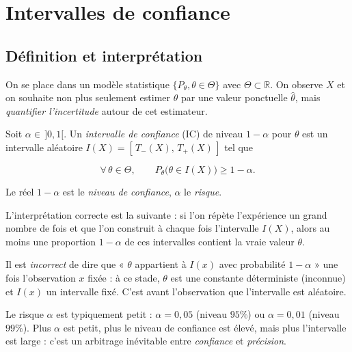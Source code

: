 \chapter{Intervalles de confiance}

\section{Définition et interprétation}

On se place dans un modèle statistique $\{P_\theta, \theta \in \Theta\}$ avec $\Theta \subset \mathbb R$. On observe $X$ et on souhaite non plus seulement estimer $\theta$ par une valeur ponctuelle $\hat\theta$, mais \textit{quantifier l'incertitude} autour de cet estimateur.

\medskip

\begin{mdframed}
\begin{definition}
Soit $\alpha \in\, ]0,1[$. Un \textit{intervalle de confiance} (IC) de niveau $1-\alpha$ pour $\theta$ est un intervalle aléatoire $I(X) = [\,T_-(X),\, T_+(X)\,]$ tel que

$$
\forall\,\theta \in \Theta, \qquad P_\theta\big(\theta \in I(X)\big) \ge 1-\alpha.
$$

Le réel $1-\alpha$ est le \textit{niveau de confiance}, $\alpha$ le \textit{risque}.
\end{definition}
\end{mdframed}

\begin{remarque} 
L'interprétation correcte est la suivante : si l'on répète l'expérience un grand nombre de fois et que l'on construit à chaque fois l'intervalle $I(X)$, alors au moins une proportion $1-\alpha$ de ces intervalles contient la vraie valeur $\theta$.

Il est \textit{incorrect} de dire que « $\theta$ appartient à $I(x)$ avec probabilité $1-\alpha$ » une fois l'observation $x$ fixée : à ce stade, $\theta$ est une constante déterministe (inconnue) et $I(x)$ un intervalle fixé. C'est avant l'observation que l'intervalle est aléatoire.
\end{remarque}

\begin{remarque}
Le risque $\alpha$ est typiquement petit : $\alpha = 0{,}05$ (niveau $95\%$) ou $\alpha = 0{,}01$ (niveau $99\%$). Plus $\alpha$ est petit, plus le niveau de confiance est élevé, mais plus l'intervalle est large : c'est un arbitrage inévitable entre \textit{confiance} et \textit{précision}.
\end{remarque}


